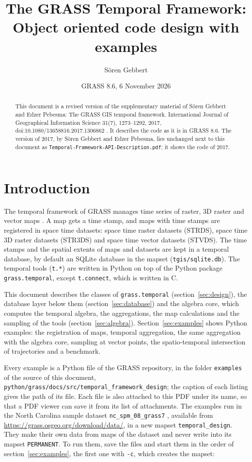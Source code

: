 \documentclass[10pt,a4paper]{article}
\title{The GRASS Temporal Framework:\\
  Object oriented code design with examples}
\author{S\"oren Gebbert}
\date{GRASS 8.6, 6 November 2026}
\newcommand{\code}[1]{\texttt{#1}}
\begin{document}
\maketitle

\begin{abstract}
\noindent This document is a revised version of the supplementary material of
S\"oren Gebbert and Edzer Pebesma: The GRASS GIS temporal framework.
International Journal of Geographical Information Science 31(7), 1273--1292,
2017, doi:10.1080/13658816.2017.1306862 \citep{gebbert2017}. It describes the
code as it is in GRASS 8.6. The version of 2017, by S\"oren Gebbert and Edzer
Pebesma, lies unchanged next to this document as
\code{Temporal-Framework-API-Description.pdf}; it shows the code of 2017.
\end{abstract}

\tableofcontents

\section{Introduction}

The temporal framework of GRASS manages time series of raster, 3D raster and
vector maps \citep{gebbert2014,gebbert2017}. A map gets a time stamp, and
maps with time stamps are registered in space time datasets: space time
raster datasets (STRDS), space time 3D raster datasets (STR3DS) and space time
vector datasets (STVDS). The time stamps and the spatial extents of maps and
datasets are kept in a temporal database, by default an SQLite database in the
mapset (\code{tgis/sqlite.db}). The temporal tools (\code{t.*}) are written in
Python on top of the Python package \code{grass.temporal}, except
\code{t.connect}, which is written in C.

This document describes the classes of \code{grass.temporal}
(section~\ref{sec:design}), the database layer below them
(section~\ref{sec:database}) and the algebra core, which computes the
temporal algebra, the aggregations, the map calculations and the sampling of
the tools (section~\ref{sec:algebra}).
Section~\ref{sec:examples} shows Python examples: the registration of maps,
temporal aggregation, the same aggregation with the algebra core, sampling at
vector points, the spatio-temporal intersection of trajectories and a
benchmark.

Every example is a Python file of the GRASS repository, in the folder
\code{examples} of the source of this document,
\code{python/grass/docs/src/temporal\_framework\_design}; the caption of each
listing gives the path of its file. Each file is also attached to this PDF
under its name, so that a PDF viewer can save it from its list of
attachments. The examples run in the North Carolina sample dataset
\code{nc\_spm\_08\_grass7}
\citep{neteler2008}, available from \url{https://grass.osgeo.org/download/data/},
in a new mapset \code{temporal\_design}. They make their own data from maps of
the dataset and never write into its mapset \code{PERMANENT}. To run them, save
the files and start them in the order of section~\ref{sec:examples}, the first
one with \code{-c}, which creates the mapset:
\end{document}

